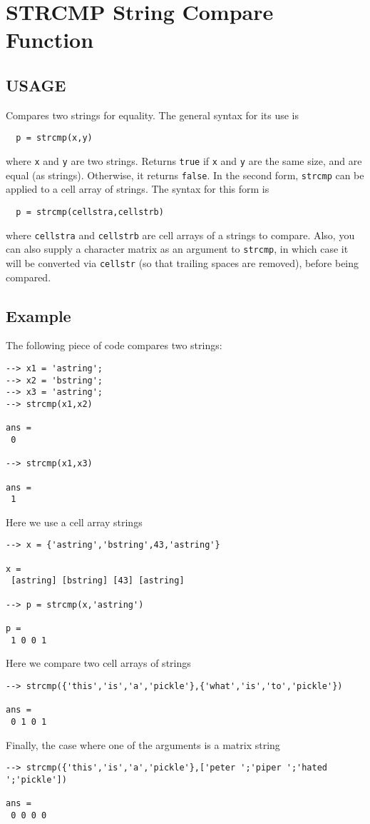 \section{STRCMP String Compare Function}

\subsection{USAGE}

Compares two strings for equality.  The general
syntax for its use is
\begin{verbatim}
  p = strcmp(x,y)
\end{verbatim}
where \verb|x| and \verb|y| are two strings.  Returns \verb|true| if \verb|x|
and \verb|y| are the same size, and are equal (as strings).  Otherwise,
it returns \verb|false|.
In the second form, \verb|strcmp| can be applied to a cell array of
strings.  The syntax for this form is
\begin{verbatim}
  p = strcmp(cellstra,cellstrb)
\end{verbatim}
where \verb|cellstra| and \verb|cellstrb| are cell arrays of a strings
to compare.  Also, you can also supply a character matrix as
an argument to \verb|strcmp|, in which case it will be converted
via \verb|cellstr| (so that trailing spaces are removed), before being
compared.
\subsection{Example}

The following piece of code compares two strings:
\begin{verbatim}
--> x1 = 'astring';
--> x2 = 'bstring';
--> x3 = 'astring';
--> strcmp(x1,x2)

ans = 
 0 

--> strcmp(x1,x3)

ans = 
 1 
\end{verbatim}
Here we use a cell array strings
\begin{verbatim}
--> x = {'astring','bstring',43,'astring'}

x = 
 [astring] [bstring] [43] [astring] 

--> p = strcmp(x,'astring')

p = 
 1 0 0 1 
\end{verbatim}
Here we compare two cell arrays of strings
\begin{verbatim}
--> strcmp({'this','is','a','pickle'},{'what','is','to','pickle'})

ans = 
 0 1 0 1 
\end{verbatim}
Finally, the case where one of the arguments is a matrix
string
\begin{verbatim}
--> strcmp({'this','is','a','pickle'},['peter ';'piper ';'hated ';'pickle'])

ans = 
 0 0 0 0 
\end{verbatim}
